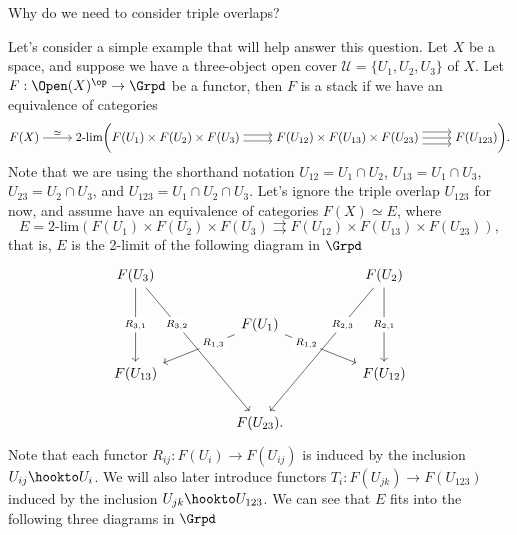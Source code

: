 \begin{question}
    Why do we need to consider triple overlaps?
\end{question}

\begin{answer}
    Let's consider a simple example that will help answer this question. Let $X$ be a space, and suppose we have a three-object open cover $\mathcal{U} = \{ U_1, U_2, U_3 \}$ of $X$. Let $F: \Open(X)^\op \to \Grpd$ be a functor, then \( F \) is a stack if we have an equivalence of categories
    \[\begin{tikzcd}[cramped]
    	{F(X)} & {\text{2-lim} \bigg( F(U_1) \times F(U_2) \times F(U_3)} & {F(U_{12}) \times F(U_{13}) \times F(U_{23})} & {F(U_{123}) \bigg).}
    	\arrow["\simeq", from=1-1, to=1-2]
    	\arrow[shift right, from=1-2, to=1-3]
    	\arrow[shift left, from=1-2, to=1-3]
    	\arrow[from=1-3, to=1-4]
    	\arrow[shift left=2, from=1-3, to=1-4]
    	\arrow[shift right=2, from=1-3, to=1-4]
    \end{tikzcd}\]
    Note that we are using the shorthand notation $U_{12} = U_1 \cap U_2$, $U_{13} = U_1 \cap U_3$, $U_{23} = U_2 \cap U_3$, and $U_{123} = U_1 \cap U_2 \cap U_3$. Let's ignore the triple overlap $U_{123}$ for now, and assume have an equivalence of categories $F(X) \simeq E$, where
    \[ E = \text{2-lim} \left( F(U_1) \times F(U_2) \times F(U_3) \rightrightarrows F(U_{12}) \times F(U_{13}) \times F(U_{23}) \right), \]
    that is, \( E \) is the 2-limit of the following diagram in $\Grpd$
    \[\begin{tikzcd}
    	{F(U_3)} &&&& {F(U_2)} \\
    	&& {F(U_1)} \\
    	{F(U_{13})} &&&& {F(U_{12})} \\
    	&& {F(U_{23}).}
    	\arrow["{R_{3,1}}"{description}, from=1-1, to=3-1]
    	\arrow["{R_{3,2}}"{description, pos=0.3}, from=1-1, to=4-3]
    	\arrow["{R_{2,3}}"{description, pos=0.3}, from=1-5, to=4-3]
    	\arrow["{R_{1,3}}"{description, pos=0.3}, from=2-3, to=3-1]
    	\arrow["{R_{1,2}}"{description, pos=0.3}, from=2-3, to=3-5]
        \arrow["{R_{2,1}}"{description}, from=1-5,to=3-5]
    \end{tikzcd}\]
    Note that each functor $R_{ij}: F(U_i) \to F(U_{ij})$ is induced by the inclusion $U_{ij} \hookto U_i$. We will also later introduce functors $T_i: F(U_{jk}) \to F(U_{123})$ induced by the inclusion $U_{jk} \hookto U_{123}$. We can see that $E$ fits into the following three diagrams in $\Grpd$
    \[\begin{tikzcd}[cramped,column sep=scriptsize]

\end{tikzcd}\]
\end{answer}
